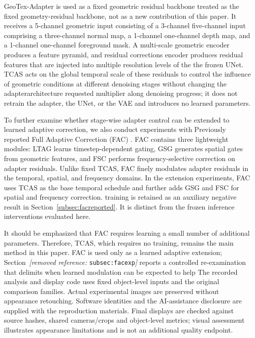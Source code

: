 \documentclass[times,twocolumn,final]{elsarticle}
\providecommand{\DIFadd}[1]{{\protect\color{blue} \sf #1}} %
\providecommand{\DIFdel}[1]{{\protect\color{red} \scriptsize #1}} %
\providecommand{\DIFaddbegin}{} %
\providecommand{\DIFaddend}{} %
\providecommand{\DIFdelbegin}{} %
\providecommand{\DIFdelend}{} %
\begin{document}
\DIFaddend GeoTex-Adapter is \DIFdelbegin \DIFdel{used as a fixed geometric residual backbone}\DIFdelend \DIFaddbegin \DIFadd{treated as the fixed geometry-residual backbone, not as a new contribution of this paper}\DIFaddend . It receives a \DIFdelbegin \DIFdel{5-channel geometric input consisting of a 3-channel }\DIFdelend \DIFaddbegin \DIFadd{five-channel input comprising a three-channel }\DIFaddend normal map, a \DIFdelbegin \DIFdel{1-channel }\DIFdelend \DIFaddbegin \DIFadd{one-channel }\DIFaddend depth map, and a \DIFdelbegin \DIFdel{1-channel }\DIFdelend \DIFaddbegin \DIFadd{one-channel }\DIFaddend foreground mask. A multi-scale \DIFdelbegin \DIFdel{geometric encoder produces a feature pyramid, and residual corrections }\DIFdelend \DIFaddbegin \DIFadd{encoder produces residual features that }\DIFaddend are injected into \DIFdelbegin \DIFdel{multiple resolution levels of the }\DIFdelend \DIFaddbegin \DIFadd{the frozen }\DIFaddend UNet. TCAS acts on the \DIFdelbegin \DIFdel{global temporal scale of these residuals to control the influence of geometric conditions at different denoising stages without changing the adapterarchitecture}\DIFdelend \DIFaddbegin \DIFadd{requested multiplier along denoising progress; it does not retrain the adapter, the UNet, or the VAE and introduces no learned parameters}\DIFaddend .

\DIFdelbegin \DIFdel{To further examine whether stage-wise adapter control can be extended to learned adaptive correction, we also conduct experiments with }\DIFdelend \DIFaddbegin \DIFadd{Previously reported }\DIFaddend Full Adaptive Correction (FAC) \DIFdelbegin \DIFdel{. FAC contains three lightweight modules: LTAG learns timestep-dependent gating, GSG generates spatial gates from geometric features, and FSC performs frequency-selective correction on adapter residuals. Unlike fixed TCAS, FAC finely modulates adapter residuals in the temporal, spatial, and frequency domains.
In the extension experiments, FAC uses TCAS as the base temporal schedule and further adds GSG and FSC for spatial and frequency correction. }\DIFdelend \DIFaddbegin \DIFadd{training is retained as an auxiliary negative result in Section~\ref{subsec:facreported}. It is distinct from the frozen inference interventions evaluated here.
}\DIFaddend 

\DIFdelbegin \DIFdel{It should be emphasized that FAC requires learning a small number of additional parameters. Therefore, TCAS, which requires no training, remains the main method in this paper. FAC is used only as a learned adaptive extension; Section~\textit{[removed reference: }\texttt{subsec:facexp}\textit{]} reports a controlled re-examination that delimits when learned modulation can be expected to help}\DIFdelend \DIFaddbegin \DIFadd{The recorded analysis and display code uses fixed object-level inputs and the original comparison families. Actual experimental images are preserved without appearance retouching. Software identities and the AI-assistance disclosure are supplied with the reproduction materials. Final displays are checked against source hashes, shared cameras/crops and object-level metrics; visual assessment illustrates appearance limitations and is not an additional quality endpoint}\DIFaddend .
\end{document}
